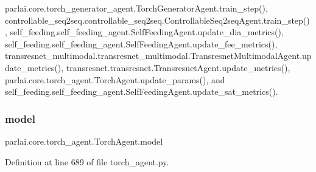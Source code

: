 parlai.\+core.\+torch\+\_\+generator\+\_\+agent.\+Torch\+Generator\+Agent.\+train\+\_\+step(), controllable\+\_\+seq2seq.\+controllable\+\_\+seq2seq.\+Controllable\+Seq2seq\+Agent.\+train\+\_\+step(), self\+\_\+feeding.\+self\+\_\+feeding\+\_\+agent.\+Self\+Feeding\+Agent.\+update\+\_\+dia\+\_\+metrics(), self\+\_\+feeding.\+self\+\_\+feeding\+\_\+agent.\+Self\+Feeding\+Agent.\+update\+\_\+fee\+\_\+metrics(), transresnet\+\_\+multimodal.\+transresnet\+\_\+multimodal.\+Transresnet\+Multimodal\+Agent.\+update\+\_\+metrics(), transresnet.\+transresnet.\+Transresnet\+Agent.\+update\+\_\+metrics(), parlai.\+core.\+torch\+\_\+agent.\+Torch\+Agent.\+update\+\_\+params(), and self\+\_\+feeding.\+self\+\_\+feeding\+\_\+agent.\+Self\+Feeding\+Agent.\+update\+\_\+sat\+\_\+metrics().

\mbox{\label{classparlai_1_1core_1_1torch__agent_1_1TorchAgent_afe40410d2e3b2565ecd27441266011fc}} 
\subsubsection{\texorpdfstring{model}{model}}
{\footnotesize\ttfamily parlai.\+core.\+torch\+\_\+agent.\+Torch\+Agent.\+model}



Definition at line 689 of file torch\+\_\+agent.\+py.



